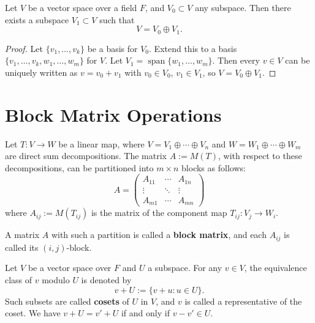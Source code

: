\begin{proposition}
  Let $V$ be a vector space over a field $F$, and $V_0 \subset V$ any subspace. Then there exists a subspace $V_1 \subset V$ such that
  \[
    V = V_0 \oplus V_1.
  \]
\end{proposition}

\begin{proof}
  Let $\{v_1, \ldots, v_k\}$ be a basis for $V_0$. Extend this to a basis $\{v_1, \ldots, v_k, w_1, \ldots, w_m\}$ for $V$. Let $V_1 = \operatorname{span}\{w_1, \ldots, w_m\}$. Then every $v \in V$ can be uniquely written as $v = v_0 + v_1$ with $v_0 \in V_0$, $v_1 \in V_1$, so $V = V_0 \oplus V_1$.
\end{proof}

\section{Block Matrix Operations}

\begin{definition}
  Let $T: V \to W$ be a linear map, where $V = V_1 \oplus \cdots \oplus V_n$ and $W = W_1 \oplus \cdots \oplus W_m$ are direct sum decompositions. The matrix $A := M(T)$, with respect to these decompositions, can be partitioned into $m \times n$ blocks as follows:
  \[
    A =
    \begin{pmatrix}
      A_{11} & \cdots & A_{1n} \\
      \vdots & \ddots & \vdots \\
      A_{m1} & \cdots & A_{mn}
    \end{pmatrix}
  \]
  where $A_{ij} := M(T_{ij})$ is the matrix of the component map $T_{ij}: V_j \to W_i$.

  A matrix $A$ with such a partition is called a \textbf{block matrix}, and each $A_{ij}$ is called its $(i,j)$-block.
\end{definition}

Let $V$ be a vector space over $F$ and $U$ a subspace. For any $v \in V$, the equivalence class of $v$ modulo $U$ is denoted by
\[
  v + U := \{ v + u : u \in U \}.
\]
Such subsets are called \textbf{cosets} of $U$ in $V$, and $v$ is called a representative of the coset. We have $v + U = v' + U$ if and only if $v - v' \in U$.

